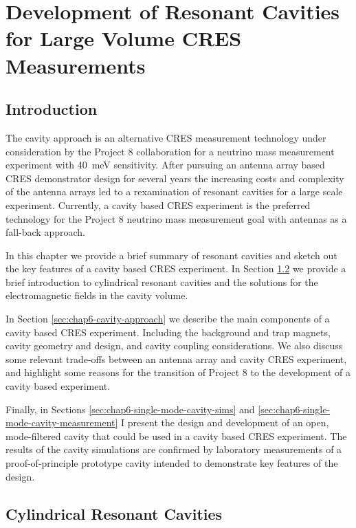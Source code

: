 
\chapter{Development of Resonant Cavities for Large Volume CRES Measurements}
\label{chap:cavity}

\section{Introduction}

The cavity approach is an alternative CRES measurement technology under consideration by the Project 8 collaboration for a neutrino mass measurement experiment with 40~meV sensitivity. After pursuing an antenna array based CRES demonstrator design for several years the increasing costs and complexity of the antenna arrays led to a rexamination of resonant cavities for a large scale experiment. Currently, a cavity based CRES experiment is the preferred technology for the Project 8 neutrino mass measurement goal with antennas as a fall-back approach. 

In this chapter we provide a brief summary of resonant cavities and sketch out the key features of a cavity based CRES experiment. In Section \ref{sec:chap6-resonant-cavities} we provide a brief introduction to cylindrical resonant cavities and the solutions for the electromagnetic fields in the cavity volume.

In Section \ref{sec:chap6-cavity-approach} we describe the main components of a cavity based CRES experiment. Including the background and trap magnets, cavity geometry and design, and cavity coupling considerations. We also discuss some relevant trade-offs between an antenna array and cavity CRES experiment, and highlight some reasons for the transition of Project 8 to the development of a cavity based experiment.

Finally, in Sections \ref{sec:chap6-single-mode-cavity-sims} and \ref{sec:chap6-single-mode-cavity-measurement} I present the design and development of an open, mode-filtered cavity that could be used in a cavity based CRES experiment. The results of the cavity simulations are confirmed by laboratory measurements of a proof-of-principle prototype cavity intended to demonstrate key features of the design.

\section{Cylindrical Resonant Cavities}
\label{sec:chap6-resonant-cavities}

